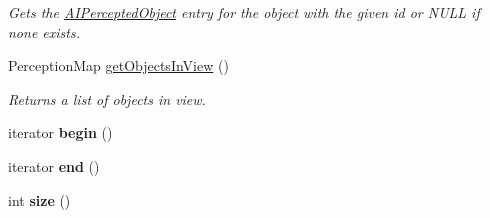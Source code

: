 \begin{DoxyCompactItemize}
\begin{DoxyCompactList}\small\item\em \-Gets the \hyperlink{classAIPerceptedObject}{\-A\-I\-Percepted\-Object} entry for the object with the given id or \-N\-U\-L\-L if none exists. \end{DoxyCompactList}\item 
\hypertarget{classAIPerception_a9a3d0746f204f589a9287319c6fc3575}{
\-Perception\-Map \hyperlink{classAIPerception_a9a3d0746f204f589a9287319c6fc3575}{get\-Objects\-In\-View} ()}
\label{d4/d0b/classAIPerception_a9a3d0746f204f589a9287319c6fc3575}

\begin{DoxyCompactList}\small\item\em \-Returns a list of objects in view. \end{DoxyCompactList}\item 
\hypertarget{classAIPerception_aeb4c4fd34118fc80a142d2afa48f36f5}{
iterator {\bfseries begin} ()}
\label{d4/d0b/classAIPerception_aeb4c4fd34118fc80a142d2afa48f36f5}

\item 
\hypertarget{classAIPerception_a5b55ddbcd0ef1b81e93550e2fab02eee}{
iterator {\bfseries end} ()}
\label{d4/d0b/classAIPerception_a5b55ddbcd0ef1b81e93550e2fab02eee}

\item 
\hypertarget{classAIPerception_a5aade684939ae00576bdb9ded74d854e}{
int {\bfseries size} ()}
\label{d4/d0b/classAIPerception_a5aade684939ae00576bdb9ded74d854e}

\end{DoxyCompactItemize}
